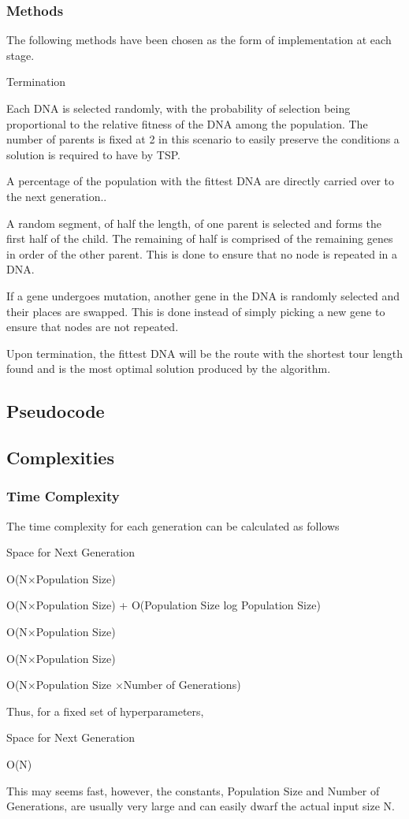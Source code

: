 \documentclass[sigconf]{acmart}
\begin{document}
\subsubsection{Methods}
The following methods have been chosen as the form of implementation at each stage.
\begin{labeling}{Termination\quad}
  \item[Selection] Each DNA is selected randomly, with the probability of selection being proportional to the relative fitness of the DNA among the population. The number of parents is fixed at 2 in this scenario to easily preserve the conditions a solution is required to have by TSP. 
  \item[Elitism] A percentage of the population with the fittest DNA are directly carried over to the next generation..
  \item[Crossover] A random segment, of half the length, of one parent is selected and forms the first half of the child. The remaining of half is comprised of the remaining genes in order of the other parent. This is done to ensure that no node is repeated in a DNA.
  \item[Mutation] If a gene undergoes mutation, another gene in the DNA is randomly selected and their places are swapped. This is done instead of simply picking a new gene to ensure that nodes are not repeated.
  \item[Termination] Upon termination, the fittest DNA will be the route with the shortest tour length found and is the most optimal solution produced by the algorithm.
\end{labeling}

\subsection{Pseudocode}
\subsection{Complexities}
\subsubsection{Time Complexity}
The time complexity for each generation can be calculated as follows
\begin{labeling}{Space for Next Generation\quad}
  \item[Initialization] O(N×Population Size)
  \item[Selection] O(N×Population Size)
  + O(Population Size log Population Size)
  \item[Mating] O(N×Population Size)
  \item[Mutation] O(N×Population Size)
  \item[Total Time Complexity] O(N×Population Size
  ×Number of Generations)
\end{labeling}
Thus, for a fixed set of hyperparameters,
\begin{labeling}{Space for Next Generation\quad}
  \item[Total Time Complexity] O(N)
\end{labeling}
This may seems fast, however, the constants, Population Size and Number of Generations, are usually very large and can easily dwarf the actual input size N. 
\end{document}
